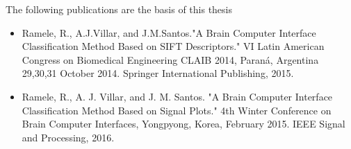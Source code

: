 \documentclass[11pt,twoside,openright]{moddalthesis}
\theoremstyle{definition}
\begin{document}
\begin{abstract}
%
%
%

\end{abstract}


\begin{listofpubs}
The following publications are the basis of this thesis

\begin{itemize}
\item Ramele, R., A.J.Villar, and J.M.Santos."A Brain Computer Interface Classification Method Based on SIFT Descriptors." VI Latin American Congress on Biomedical Engineering CLAIB 2014, Paraná, Argentina 29,30,31 October 2014. Springer International Publishing, 2015.
\item Ramele, R., A. J. Villar, and J. M. Santos. "A Brain Computer Interface Classification Method Based on Signal Plots." 4th Winter Conference on Brain Computer Interfaces, Yongpyong, Korea, February 2015. IEEE Signal and Processing, 2016. 
\end{itemize}
\end{listofpubs}
\end{document}
